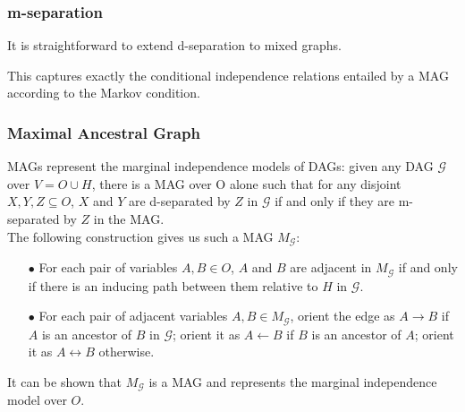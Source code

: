 \documentclass{beamer}
\begin{document}
\begin{frame}
    \frametitle{m-separation}
    \begin{flushleft}
        It is straightforward to extend d-separation to mixed graphs.
    \end{flushleft}
    \begin{flushleft}
        This captures exactly the conditional independence relations entailed by a MAG according to the Markov condition.
    \end{flushleft}
\end{frame}

\begin{frame}
    \frametitle{Maximal Ancestral Graph}
    \begin{flushleft}
        MAGs represent the marginal independence models of DAGs: given any DAG $\mathcal{G}$ over $V=O\cup H$, there is a 
        MAG over O alone such that for any disjoint $X,Y,Z\subseteq O$, $X$ and $Y$ are d-separated by $Z$ in $\mathcal{G}$ 
        if and only if they are m-separated by $Z$ in the MAG. \\
        The following construction gives us such a MAG $M_{\mathcal{G}}$:
    \end{flushleft}
    \begin{itemize}
        \item[$\bullet$] For each pair of variables $A,B\in O$, $A$ and $B$ are adjacent in $M_{\mathcal{G}}$ if and only if there 
        is an inducing path between them relative to $H$ in $\mathcal{G}$. 
        \item[$\bullet$] For each pair of adjacent variables $A,B\in M_{\mathcal{G}}$, orient the edge as $A\rightarrow B$ if $A$ 
        is an ancestor of $B$ in $\mathcal{G}$; orient it as $A\leftarrow B$ if $B$ is an ancestor of $A$; orient it 
        as $A\leftrightarrow B$ otherwise.
    \end{itemize}
    \begin{flushleft}
        It can be shown that $M_{\mathcal{G}}$ is a MAG and represents the marginal independence model over $O$.
    \end{flushleft}
\end{frame}
\end{document}
